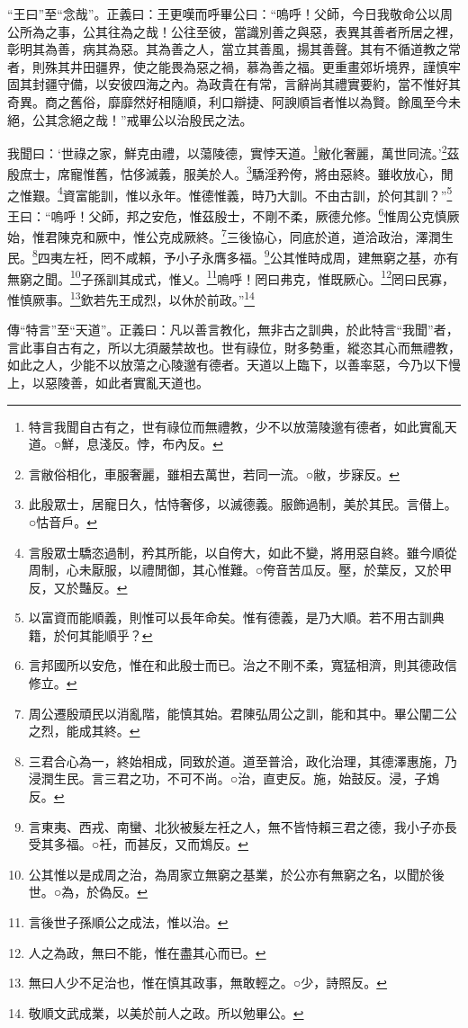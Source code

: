 {\noindent\shu{}\fzkt “王曰”至“念哉”。正義曰：王更嘆而呼畢公曰：“嗚呼！父師，今日我敬命公以周公所為之事，公其往為之哉！公往至彼，當識別善之與惡，表異其善者所居之裡，彰明其為善，病其為惡。其為善之人，當立其善風，揚其善聲。其有不循道教之常者，則殊其井田疆界，使之能畏為惡之禍，慕為善之福。更重畫郊圻境界，謹慎牢固其封疆守備，以安彼四海之內。為政貴在有常，言辭尚其禮實要約，當不惟好其奇異。商之舊俗，靡靡然好相隨順，利口辯捷、阿諛順旨者惟以為賢。餘風至今未絕，公其念絕之哉！”戒畢公以治殷民之法。 \par}

我聞曰：‘世祿之家，鮮克由禮，以蕩陵德，實悖天道。\footnote{特言我聞自古有之，世有祿位而無禮教，少不以放蕩陵邈有德者，如此實亂天道。○鮮，息淺反。悖，布內反。}敝化奢麗，萬世同流。’\footnote{言敝俗相化，車服奢麗，雖相去萬世，若同一流。○敝，步寐反。}茲殷庶士，席寵惟舊，怙侈滅義，服美於人。\footnote{此殷眾士，居寵日久，怙恃奢侈，以滅德義。服飾過制，美於其民。言僣上。○怙音戶。}驕淫矜侉，將由惡終。雖收放心，閒之惟艱。\footnote{言殷眾士驕恣過制，矜其所能，以自侉大，如此不變，將用惡自終。雖今順從周制，心未厭服，以禮閒御，其心惟難。○侉音苦瓜反。壓，於葉反，又於甲反，又於豔反。}資富能訓，惟以永年。惟德惟義，時乃大訓。不由古訓，於何其訓？”\footnote{以富資而能順義，則惟可以長年命矣。惟有德義，是乃大順。若不用古訓典籍，於何其能順乎？}王曰：“嗚呼！父師，邦之安危，惟茲殷士，不剛不柔，厥德允修。\footnote{言邦國所以安危，惟在和此殷士而已。治之不剛不柔，寬猛相濟，則其德政信修立。}惟周公克慎厥始，惟君陳克和厥中，惟公克成厥終。\footnote{周公遷殷頑民以消亂階，能慎其始。君陳弘周公之訓，能和其中。畢公闡二公之烈，能成其終。}三後協心，同底於道，道洽政治，澤潤生民。\footnote{三君合心為一，終始相成，同致於道。道至普洽，政化治理，其德澤惠施，乃浸潤生民。言三君之功，不可不尚。○治，直吏反。施，始鼓反。浸，子鴆反。}四夷左衽，罔不咸賴，予小子永膺多福。\footnote{言東夷、西戎、南蠻、北狄被髮左衽之人，無不皆恃賴三君之德，我小子亦長受其多福。○衽，而甚反，又而鴆反。}公其惟時成周，建無窮之基，亦有無窮之聞。\footnote{公其惟以是成周之治，為周家立無窮之基業，於公亦有無窮之名，以聞於後世。○為，於偽反。}子孫訓其成式，惟乂。\footnote{言後世子孫順公之成法，惟以治。}嗚呼！罔曰弗克，惟既厥心。\footnote{人之為政，無曰不能，惟在盡其心而已。}罔曰民寡，惟慎厥事。\footnote{無曰人少不足治也，惟在慎其政事，無敢輕之。○少，詩照反。}欽若先王成烈，以休於前政。”\footnote{敬順文武成業，以美於前人之政。所以勉畢公。}


{\noindent\zhuan{}\fzbyks 傳“特言”至“天道”。正義曰：凡以善言教化，無非古之訓典，於此特言“我聞”者，言此事自古有之，所以尢須嚴禁故也。世有祿位，財多勢重，縱恣其心而無禮教，如此之人，少能不以放蕩之心陵邈有德者。天道以上臨下，以善率惡，今乃以下慢上，以惡陵善，如此者實亂天道也。 \par}

